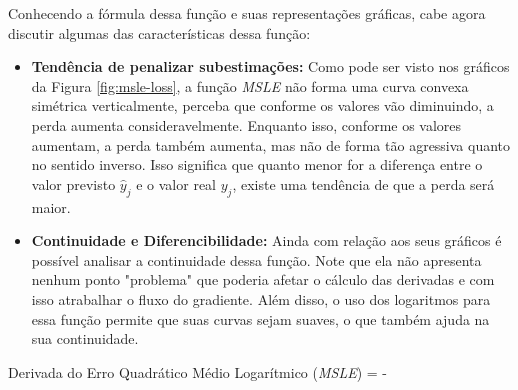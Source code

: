 Conhecendo a fórmula dessa função e suas representações gráficas, cabe agora discutir algumas das características dessa função:

\begin{itemize}
    \item \textbf{Tendência de penalizar subestimações:} Como pode ser visto nos gráficos da Figura \ref{fig:msle-loss}, a função \textit{MSLE} não forma uma curva convexa simétrica verticalmente, perceba que conforme os valores vão diminuindo, a perda aumenta consideravelmente. Enquanto isso, conforme os valores aumentam, a perda também aumenta, mas não de forma tão agressiva quanto no sentido inverso. Isso significa que quanto menor for a diferença entre o valor previsto $\hat{y}_j$ e o valor real $y_j$, existe uma tendência de que a perda será maior.
    \item \textbf{Continuidade e Diferencibilidade:} Ainda com relação aos seus gráficos é possível analisar a continuidade dessa função. Note que ela não apresenta nenhum ponto "problema" que poderia afetar o cálculo das derivadas e com isso atrabalhar o fluxo do gradiente. Além disso, o uso dos logaritmos para essa função permite que suas curvas sejam suaves, o que também ajuda na sua continuidade.
\end{itemize}

\begin{equacaodestaque}{Derivada do Erro Quadrático Médio Logarítmico (\textit{MSLE})}
     = -  \cdot {}
    \label{eq:msle-derivada}
\end{equacaodestaque}


